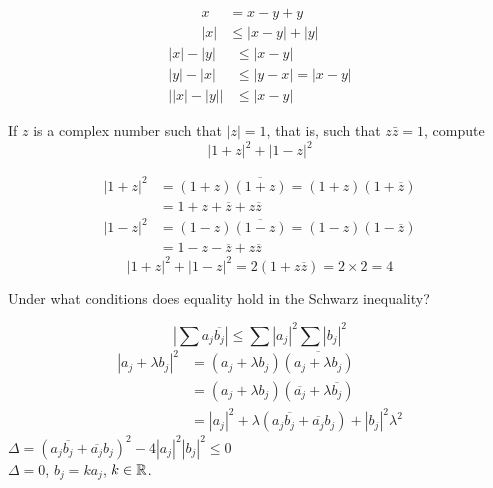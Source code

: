 \mySolve 
\begin{align*}
    x &= x - y + y \\
    |x| &\leq |x-y| + |y| 
\end{align*}
\begin{align*}
    |x| - |y| &\leq  |x-y| \\
    |y| - |x| &\leq  |y-x| = |x-y| \\
    \left| |x| - |y| \right| &\leq |x - y|
\end{align*}


\begin{myExercise}
    \label{ex:1.14}
    If $z$ is a complex number such that $|z| = 1$, that is, such that $z\bar{z} = 1$, compute
    \begin{equation*}
        |1+z|^2 + |1-z|^2
    \end{equation*}
\end{myExercise}

\mySolve
\begin{align*}
    |1+z|^2 &= (1+z)\overline{(1+z)} = (1+z)(1+\overline{z}) \\
    &= 1+z+\overline{z}+z\overline{z}
\end{align*}
\begin{align*}
    |1-z|^2 &= (1-z)\overline{(1-z)} = (1-z)(1-\overline{z}) \\
    &= 1-z-\overline{z}+z\overline{z}
\end{align*}
\begin{equation*}
    |1+z|^2 + |1-z|^2 = 2(1+z\overline{z}) = 2\times 2 = 4
\end{equation*}


\begin{myExercise}
    \label{ex:1.15}
    Under what conditions does equality hold in the Schwarz inequality?
\end{myExercise}

\mySolve
\begin{equation*}
    \left|\sum a_j \overline{b_j}\right| \leq \sum |a_j|^2 \sum |b_j|^2 
\end{equation*}
\begin{align*}
    |a_j + \lambda b_j|^2 
    &= (a_j + \lambda b_j) \overline{(a_j + \lambda b_j)} \\
    &= (a_j + \lambda b_j) (\overline{a_j} + \lambda \overline{b_j}) \\
    &= |a_j|^2 + \lambda (a_j \overline{b_j} + \overline{a_j} b_j) + |b_j|^2 \lambda^2 
\end{align*}
$\Delta = (a_j \overline{b_j} + \overline{a_j} b_j)^2 - 4|a_j|^2|b_j|^2 \leq 0$ \\
$\Delta = 0$, $b_j = k a_j$, $k \in {\protect\mathbb R}$.


